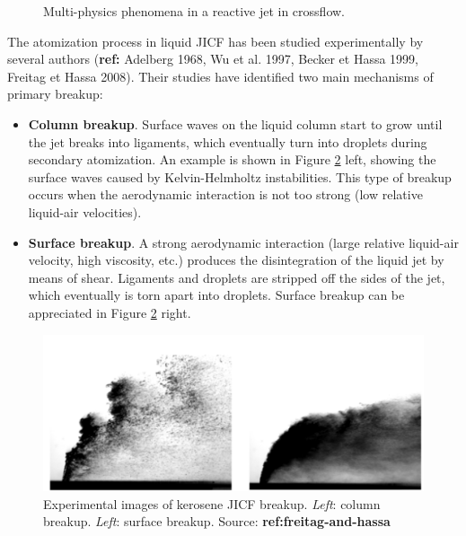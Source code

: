 \begin{figure}[ht]
     \centering
      \caption{Multi-physics phenomena in a reactive jet in crossflow. }
      \label{fig:JICF_multiphysics}
\end{figure}

The atomization process in liquid JICF has been studied experimentally by several authors (\textbf{ref:} Adelberg 1968, Wu et al. 1997, Becker et Hassa 1999, Freitag et Hassa 2008). Their studies have identified two main mechanisms of primary breakup:

\begin{itemize}

	\item \textbf{Column breakup}. Surface waves on the liquid column start to grow until the jet breaks into ligaments,
which eventually turn into droplets during secondary atomization. An example is shown in Figure \ref{fig:JICF_breakup_mechanisms_freitag}
left, showing the surface waves caused by Kelvin-Helmholtz instabilities. This type of breakup occurs
when the aerodynamic interaction is not too strong (low relative liquid-air velocities).

\item \textbf{Surface breakup}. A strong aerodynamic interaction (large relative liquid-air velocity, high viscosity,
etc.) produces the disintegration of the liquid jet by means of shear. Ligaments and droplets are
stripped off the sides of the jet, which eventually is torn apart into droplets. Surface breakup can be
appreciated in Figure \ref{fig:JICF_breakup_mechanisms_freitag} right.

\end{itemize}


\begin{figure}[h!]
	\centering
	\includegraphics[scale=0.5]{./part0_intro/JICF_breakup-mechanisms_freitag}
	\caption{Experimental images of kerosene JICF breakup. \textsl{Left}: column breakup. \textsl{Left}: surface breakup. Source: \textbf{ref:freitag-and-hassa}}
	\label{fig:JICF_breakup_mechanisms_freitag}
\end{figure}

